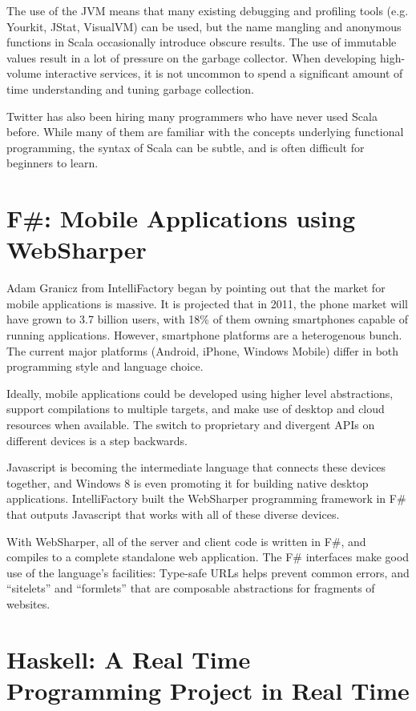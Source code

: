 \documentclass{jfp1}
\begin{document}
The use of the JVM means that many existing debugging and profiling tools (e.g.
Yourkit, JStat, VisualVM) can be used, but the name mangling and anonymous
functions in Scala occasionally introduce obscure results.  The use of
immutable values result in a lot of pressure on the garbage collector. When
developing high-volume interactive services, it is not uncommon to spend a
significant amount of time understanding and tuning garbage collection.

Twitter has also been hiring many programmers who have never used Scala before.
While many of them are familiar with the concepts underlying functional
programming, the syntax of Scala can be subtle, and is often difficult for beginners
to learn.

\section{F\#: Mobile Applications using WebSharper}

Adam Granicz from IntelliFactory began by pointing out that the market for
mobile applications is massive.  It is projected that in 2011, the phone market
will have grown to 3.7 billion users, with 18\% of them owning smartphones
capable of running applications.  However, smartphone platforms are a
heterogenous bunch. The current major platforms (Android, iPhone, Windows
Mobile) differ in both programming style and language choice.

Ideally, mobile applications could be developed using higher level
abstractions, support compilations to multiple targets, and make use of desktop
and cloud resources when available. The switch to proprietary and divergent
APIs on different devices is a step backwards.

Javascript is becoming the intermediate language that connects these devices
together, and Windows 8 is even promoting it for building native desktop
applications. IntelliFactory built the WebSharper programming framework in F\#
that outputs Javascript that works with all of these diverse devices.

With WebSharper, all of the server and client code is written in F\#, and
compiles to a complete standalone web application. The F\# interfaces make good
use of the language's facilities: Type-safe URLs helps prevent common errors,
and ``sitelets'' and ``formlets'' that are composable abstractions for
fragments of websites.

\section{Haskell: A Real Time Programming Project in Real Time}
\end{document}
